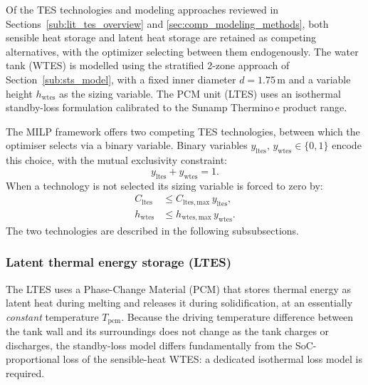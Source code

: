 \documentclass[11pt,a4paper]{report}
\begin{document}
Of the TES technologies and modeling approaches reviewed in Sections~\ref{sub:lit_tes_overview} and \ref{sec:comp_modeling_methods}, both sensible heat storage and latent heat storage are retained as competing alternatives, with the optimizer selecting between them endogenously.
The water tank (WTES) is modelled using the stratified 2-zone approach of Section~\ref{sub:sts_model}, with a fixed inner diameter $d = 1.75\,\text{m}$ and a variable height $h_\mathrm{wtes}$ as the sizing variable.
The PCM unit (LTES) uses an isothermal standby-loss formulation calibrated to the Sunamp Thermino\,e product range.

The MILP framework offers two competing TES technologies, between which the
optimiser selects via a binary variable.
Binary variables $y_\mathrm{ltes},\,y_\mathrm{wtes} \in \{0,1\}$ encode this
choice, with the mutual exclusivity constraint:
\begin{equation}
    y_\mathrm{ltes} + y_\mathrm{wtes} = 1.
    \label{eq:tes_select}
\end{equation}
When a technology is not selected its sizing variable is forced to zero by:
\begin{align}
    C_\mathrm{ltes} &\leq C_\mathrm{ltes,max}\,y_\mathrm{ltes}, \label{eq:ltes_select} \\
    h_\mathrm{wtes} &\leq h_\mathrm{wtes,max}\,y_\mathrm{wtes}. \label{eq:wtes_select}
\end{align}
The two technologies are described in the following subsubsections.

\subsubsection{Latent thermal energy storage (LTES)}
\label{sub:ltes_model}

The LTES uses a Phase-Change Material (PCM) that stores thermal energy as latent
heat during melting and releases it during solidification, at an essentially
\emph{constant} temperature $T_\mathrm{pcm}$.
Because the driving temperature difference between the tank wall and its
surroundings does not change as the tank charges or discharges, the standby-loss
model differs fundamentally from the SoC-proportional loss of the sensible-heat
WTES: a dedicated isothermal loss model is required.

\end{document}
